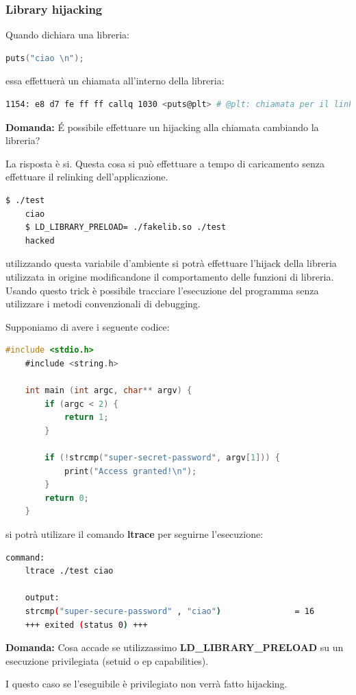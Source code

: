 \subsubsection{Library hijacking}
Quando dichiara una libreria: 
\begin{lstlisting}[language=C]
    puts("ciao \n");
\end{lstlisting}
essa effettuerà un chiamata all'interno della libreria:
\begin{lstlisting}[language=bash]
    1154: e8 d7 fe ff ff callq 1030 <puts@plt> # @plt: chiamata per il linking dinamico
\end{lstlisting}
\textbf{Domanda:} É possibile effettuare un hijacking alla chiamata cambiando la libreria?

La risposta è si. Questa cosa si può effettuare a tempo di caricamento senza effettuare il relinking dell'applicazione.
\begin{lstlisting}[language=bash]
    $ ./test
    ciao
    $ LD_LIBRARY_PRELOAD= ./fakelib.so ./test
    hacked
\end{lstlisting}
utilizzando questa variabile d'ambiente si potrà effettuare l'hijack della libreria utilizzata in origine modificandone il comportamento delle funzioni di libreria.
Usando questo trick è possibile tracciare l'esecuzione del programma senza utilizzare i metodi convenzionali di debugging.

Supponiamo di avere i seguente codice:
\begin{lstlisting}[language=C]
    #include <stdio.h>
    #include <string.h>

    int main (int argc, char** argv) {
        if (argc < 2) {
            return 1;
        }

        if (!strcmp("super-secret-password", argv[1])) {
            print("Access granted!\n");
        }
        return 0;
    }
\end{lstlisting}
si potrà utilizare il comando \textbf{ltrace} per seguirne l'esecuzione:
\begin{lstlisting}[language=bash]
    command:
    ltrace ./test ciao

    output:
    strcmp("super-secure-password" , "ciao")               = 16
    +++ exited (status 0) +++       
\end{lstlisting}

\textbf{Domanda:} Cosa accade se utilizzassimo \textbf{LD\_LIBRARY\_PRELOAD} su un esecuzione privilegiata (setuid o ep capabilities).

I questo caso se l'eseguibile è privilegiato non verrà fatto hijacking.

